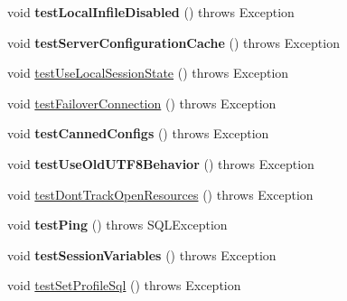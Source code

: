 \begin{DoxyCompactItemize}
\item 
\mbox{\label{classtestsuite_1_1simple_1_1_connection_test_ae0b70d037f67120f9758b18cea34e4b3}} 
void {\bfseries test\+Local\+Infile\+Disabled} ()  throws Exception 
\item 
\mbox{\label{classtestsuite_1_1simple_1_1_connection_test_a6fa3bc9c7ac7d02ffdc0856f8cf72f91}} 
void {\bfseries test\+Server\+Configuration\+Cache} ()  throws Exception 
\item 
void \mbox{\hyperlink{classtestsuite_1_1simple_1_1_connection_test_abaf8e563e167bfb40021b103f3cccd70}{test\+Use\+Local\+Session\+State}} ()  throws Exception 
\item 
void \mbox{\hyperlink{classtestsuite_1_1simple_1_1_connection_test_a6e0b85502950068c4a43a70f70f93a56}{test\+Failover\+Connection}} ()  throws Exception 
\item 
\mbox{\label{classtestsuite_1_1simple_1_1_connection_test_a00b269a0035eddf1f921422e0e01c4e2}} 
void {\bfseries test\+Canned\+Configs} ()  throws Exception 
\item 
\mbox{\label{classtestsuite_1_1simple_1_1_connection_test_a55c54f86b4450240678a5ed9eb986b8a}} 
void {\bfseries test\+Use\+Old\+U\+T\+F8\+Behavior} ()  throws Exception 
\item 
void \mbox{\hyperlink{classtestsuite_1_1simple_1_1_connection_test_a018eaff5a1cc1db390b843a77c50d63f}{test\+Dont\+Track\+Open\+Resources}} ()  throws Exception 
\item 
\mbox{\label{classtestsuite_1_1simple_1_1_connection_test_a532ba6cd7d05b27ab48c9c6024baeca6}} 
void {\bfseries test\+Ping} ()  throws S\+Q\+L\+Exception 
\item 
\mbox{\label{classtestsuite_1_1simple_1_1_connection_test_aa0fe29922fbe1bc8263651e579788c61}} 
void {\bfseries test\+Session\+Variables} ()  throws Exception 
\item 
void \mbox{\hyperlink{classtestsuite_1_1simple_1_1_connection_test_a279c085ad223ecdc6dc0a53ed7d73abb}{test\+Set\+Profile\+Sql}} ()  throws Exception 

\end{DoxyCompactItemize}
